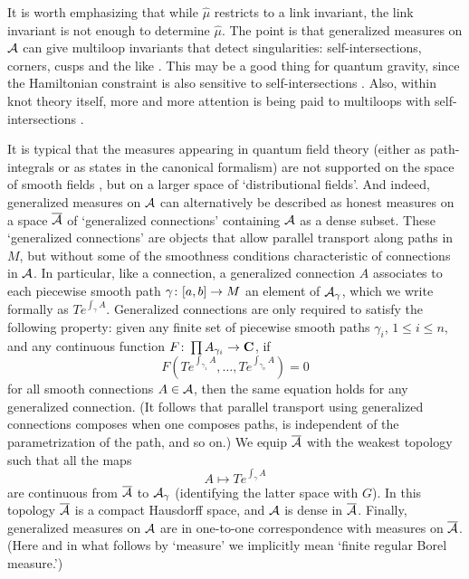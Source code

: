 \noindent It is worth emphasizing that while $\hat \mu$ restricts to a
link invariant, the link invariant is not enough to determine $\hat\mu$.
The point is that generalized measures on ${\cal A}$ can give multiloop
invariants that detect singularities: self-intersections, corners, cusps
and the like \cite{Baez2}.  This may be a good thing for quantum
gravity, since the Hamiltonian constraint is also sensitive to
self-intersections \cite{RS}.  Also, within knot theory itself, more and
more attention is being paid to multiloops with self-intersections
\cite{BarNatan,Birman}.

It is typical that the measures appearing in quantum field theory
(either as path-integrals or as states in the canonical formalism) are
not supported on the space of smooth fields \cite{MM}, but on a larger
space of `distributional fields'.  And indeed, generalized measures on
${\cal A}$ can alternatively be described as honest measures on a space
$\overline {{\cal A}}$ of `generalized connections' containing ${\cal A}$ as a dense
subset.  These `generalized connections' are objects that allow parallel
transport along paths in $M$, but without some of the smoothness
conditions characteristic of connections in ${\cal A}$.  In particular, like a
connection, a generalized connection $A$ associates to each piecewise
smooth path $\gamma\colon [a,b] \rightarrow M$ an element of ${\cal A}_\gamma$, which
we write formally as $Te^{\int_\gamma A}$.  Generalized connections are
only required to satisfy the following property: given any finite set of
piecewise smooth paths $\gamma_i$, $1 \le i \le n$, and any continuous
function $F \colon \prod A_{\gamma_i} \rightarrow {\bf C}$, if
\[         F(Te^{\int_{\gamma_1} A}, \dots, Te^{\int_{\gamma_n} A}) = 0
\]
for all smooth connections $A \in {\cal A}$, then the same equation holds for
any generalized connection.  (It follows that parallel transport using
generalized connections composes when one composes paths, is independent
of the parametrization of the path, and so on.)  We equip $\overline {{\cal A}}$
with the weakest topology such that all the maps
\[               A \mapsto T e^{\int_\gamma A}  \]
are continuous from $\overline {{\cal A}}$ to ${\cal A}_\gamma$ (identifying the
latter space with $G$).  In this topology $\overline {{\cal A}}$ is a compact
Hausdorff space, and ${\cal A}$ is dense in $\overline {{\cal A}}$.  Finally,
generalized measures on ${\cal A}$ are in one-to-one correspondence with
measures on $\overline {{\cal A}}$.   (Here and in what follows by `measure' we
implicitly mean `finite regular Borel measure.')

